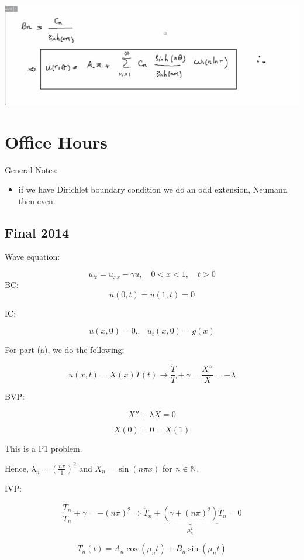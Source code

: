 \documentclass{article}
\begin{document}
\begin{center}
    \includegraphics[width = 0.9 \textwidth]{11.png}
\end{center}

\section{Office Hours}

General Notes:

\begin{itemize}
    \item if we have Dirichlet boundary condition we do an odd extension, Neumann then even. 
\end{itemize}

\subsection{Final 2014}

Wave equation:

$$u_{tt} = u_{xx} - \gamma u, \quad 0 < x < 1, \quad t > 0$$
BC:
$$u(0,t) = u(1,t) = 0$$

IC:

$$u(x,0) = 0, \quad u_t(x,0) = g(x)$$

For part (a), we do the following:

$$u(x,t) = X(x) T(t) \rightarrow \frac{\ddot{T}}{T} + \gamma = \frac{X''}{X} = - \lambda$$

BVP:

$$X'' + \lambda X = 0$$

$$X(0) = 0 = X(1)$$

This is a P1 problem. 

Hence, $\lambda_n = \left( \frac{n \pi}{1} \right)^2$ and $X_n = \sin(n \pi x)$ for $n \in \mathbb{N}$. 

\hfill

IVP:


$$\frac{\ddot{T}_n}{T_n} + \gamma = -(n \pi)^2 \Rightarrow \ddot{T}_n + \underbrace{(\gamma + (n \pi)^2 )}_{\mu_n^2} T_n = 0$$

$$T_n(t) = A_n \cos(\mu_n t) + B_n \sin(\mu_n t)$$
\end{document}
